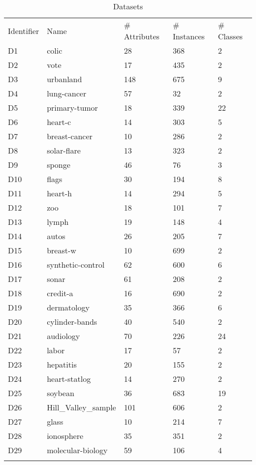 \begin{table*}[h]
\caption{Datasets}
\label{tbl:datasets}\begin{tabular}{lllll}
\noalign{\smallskip}\hline\noalign{\smallskip}
Identifier&Name&# Attributes&# Instances&# Classes\\\noalign{\smallskip}\hline
D1&colic&28&368&2\\
D2&vote&17&435&2\\
D3&urbanland&148&675&9\\
D4&lung-cancer&57&32&2\\
D5&primary-tumor&18&339&22\\
D6&heart-c&14&303&5\\
D7&breast-cancer&10&286&2\\
D8&solar-flare&13&323&2\\
D9&sponge&46&76&3\\
D10&flags&30&194&8\\
D11&heart-h&14&294&5\\
D12&zoo&18&101&7\\
D13&lymph&19&148&4\\
D14&autos&26&205&7\\
D15&breast-w&10&699&2\\
D16&synthetic-control&62&600&6\\
D17&sonar&61&208&2\\
D18&credit-a&16&690&2\\
D19&dermatology&35&366&6\\
D20&cylinder-bands&40&540&2\\
D21&audiology&70&226&24\\
D22&labor&17&57&2\\
D23&hepatitis&20&155&2\\
D24&heart-statlog&14&270&2\\
D25&soybean&36&683&19\\
D26&Hill_Valley_sample&101&606&2\\
D27&glass&10&214&7\\
D28&ionosphere&35&351&2\\
D29&molecular-biology&59&106&4\\
\noalign{\smallskip}\hline
\end{tabular}
\end{table*}